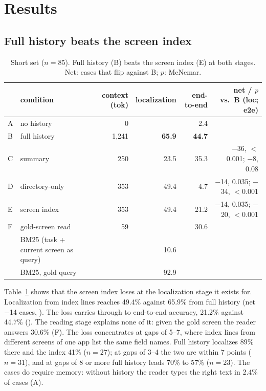\section{Results}
\label{sec:results}

\subsection{Full history beats the screen index}
\label{sec:main}
\begin{table}[t]
\centering\footnotesize
\caption{Short set ($n=85$). Full history (B) beats the screen index (E) at both stages. Net: cases that flip against B; $p$: McNemar.}
\label{tab:main}
\begin{tabular}{llrrrr}
\toprule
 & condition & context (tok) & localization & end-to-end & net / $p$ vs.\ B (loc; e2e) \\
\midrule
A & no history & 0 & & 2.4 & \\
B & full history & 1,241 & \textbf{65.9} & \textbf{44.7} & \\
C & summary & 250 & 23.5 & 35.3 & $-$36, $<$0.001; $-$8, 0.08 \\
D & directory-only & 353 & 49.4 & 4.7 & $-$14, 0.035; $-$34, $<$0.001 \\
E & screen index & 353 & 49.4 & 21.2 & $-$14, 0.035; $-$20, $<$0.001 \\
F & gold-screen read & 59 & & 30.6 & \\
\midrule
 & BM25 (task + current screen as query) & & 10.6 & & \\
 & BM25, gold query & & 92.9 & & \\
\bottomrule
\end{tabular}
\end{table}

Table~\ref{tab:main} shows that the screen index loses at the localization stage it exists for. Localization from index lines reaches 49.4\% against 65.9\% from full history (net $-$14 cases, ). The loss carries through to end-to-end accuracy, 21.2\% against 44.7\% (). The reading stage explains none of it: given the gold screen the reader answers 30.6\% (F). The loss concentrates at gaps of 5--7, where index lines from different screens of one app list the same field names. Full history localizes 89\% there and the index 41\% ($n=27$); at gaps of 3--4 the two are within 7 points ($n=31$), and at gaps of 8 or more full history leads 70\% to 57\% ($n=23$). The cases do require memory: without history the reader types the right text in 2.4\% of cases (A).

